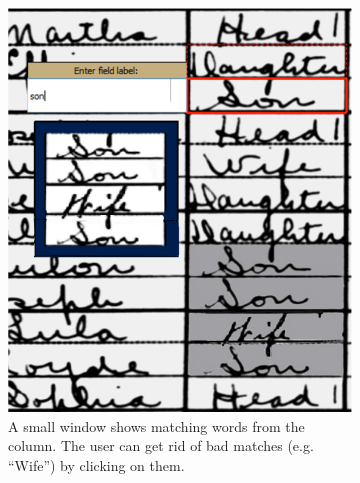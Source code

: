 \documentclass[conference]{IEEEtran}
\begin{document}
\begin{figure}
    \centering
    \begin{subfigure}[t]{0.23\textwidth}
    		\centering
    		\includegraphics[width=\textwidth]{ii_ex_new_a}
    		\caption{A small window shows matching words from the column. The user can get rid of bad matches (e.g. ``Wife'') by clicking on them.}
    	\end{subfigure}
    	~
    	\begin{subfigure}[t]{0.23\textwidth}
    		\centering

\end{subfigure}
\end{figure}
\end{document}
